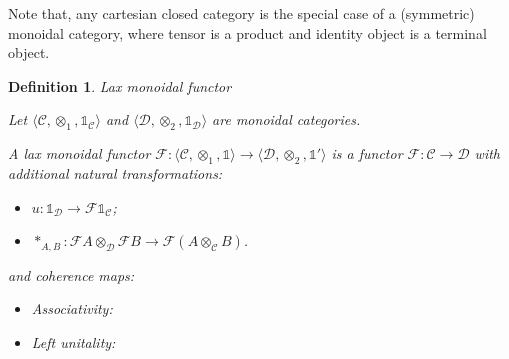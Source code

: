 \documentclass[a4paper]{article}
\newtheorem{defin}{Definition}
\begin{document}
Note that, any cartesian closed category is the special case of a (symmetric) monoidal category, where tensor is a product and identity object is a terminal object.

\begin{defin} Lax monoidal functor

  Let $\langle \mathcal{C}, \otimes_1, \mathds{1}_{\mathcal{C}} \rangle$ and $\langle \mathcal{D}, \otimes_2, \mathds{1}_{\mathcal{D}} \rangle$ are monoidal categories.

  A lax monoidal functor $\mathcal{F} : \langle \mathcal{C}, \otimes_1, \mathds{1} \rangle \to \langle \mathcal{D}, \otimes_2, \mathds{1}' \rangle$ is a functor
  $\mathcal{F} : \mathcal{C} \to \mathcal{D}$ with additional natural transformations:

  \begin{itemize}
  \item $u : \mathds{1}_{\mathcal{D}} \to \mathcal{F}\mathds{1}_{\mathcal{C}}$;
  \item $\ast_{A, B} : \mathcal{F}A \otimes_{\mathcal{D}} \mathcal{F}B \to \mathcal{F}(A \otimes_{\mathcal{C}} B)$.
  \end{itemize}

  and coherence maps:

  \begin{itemize}
    \item Associativity:


    \item Left unitality:



\end{itemize}
\end{defin}
\end{document}
